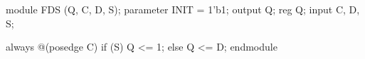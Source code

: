 \begin{vcode}
module FDS (Q, C, D, S);
    parameter INIT = 1'b1;
    output Q;
    reg    Q;
    input  C, D, S;

    always @(posedge C)
        if (S)
        Q <= 1;
        else
        Q <= D;
endmodule
\end{vcode}

